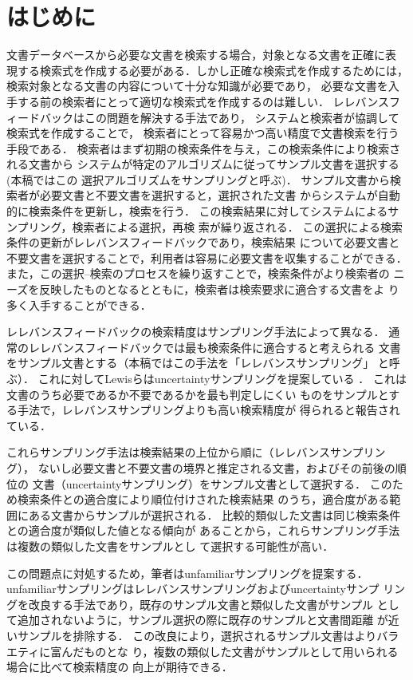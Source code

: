 \section{はじめに}
文書データベースから必要な文書を検索する場合，対象となる文書を正確に表
現する検索式を作成する必要がある．しかし正確な検索式を作成するためには，
検索対象となる文書の内容について十分な知識が必要であり，
必要な文書を入手する前の検索者にとって適切な検索式を作成するのは難しい．
レレバンスフィードバックはこの問題を解決する手法であり，
システムと検索者が協調して検索式を作成することで，
検索者にとって容易かつ高い精度で文書検索を行う手段である．
検索者はまず初期の検索条件を与え，この検索条件により検索される文書から
システムが特定のアルゴリズムに従ってサンプル文書を選択する(本稿ではこの
選択アルゴリズムをサンプリングと呼ぶ)．
サンプル文書から検索者が必要文書と不要文書を選択すると，選択された文書
からシステムが自動的に検索条件を更新し，検索を行う．
この検索結果に対してシステムによるサンプリング，検索者による選択，再検
索が繰り返される．
この選択による検索条件の更新がレレバンスフィードバックであり，検索結果
について必要文書と
不要文書を選択することで，利用者は容易に必要文書を収集することができる．
また，この選択--検索のプロセスを繰り返すことで，検索条件がより検索者の
ニーズを反映したものとなるとともに，検索者は検索要求に適合する文書をよ
り多く入手することができる．

レレバンスフィードバックの検索精度はサンプリング手法によって異なる．
通常のレレバンスフィードバックでは最も検索条件に適合すると考えられる
文書をサンプル文書とする（本稿ではこの手法を「レレバンスサンプリング」
と呼ぶ）．
これに対してLewisらはuncertaintyサンプリングを提案している
\cite{bib:DLewis}．
これは文書のうち必要であるか不要であるかを最も判定しにくい
ものをサンプルとする手法で，レレバンスサンプリングよりも高い検索精度が
得られると報告されている．

これらサンプリング手法は検索結果の上位から順に（レレバンスサンプリング），
ないし必要文書と不要文書の境界と推定される文書，およびその前後の順位の
文書（uncertaintyサンプリング）をサンプル文書として選択する．
このため検索条件との適合度により順位付けされた検索結果
のうち，適合度がある範囲にある文書からサンプルが選択される．
比較的類似した文書は同じ検索条件との適合度が類似した値となる傾向が
あることから，これらサンプリング手法は複数の類似した文書をサンプルとし
て選択する可能性が高い．

この問題点に対処するため，筆者はunfamiliarサンプリングを提案する．
unfamiliarサンプリングはレレバンスサンプリングおよびuncertaintyサンプ
リングを改良する手法であり，既存のサンプル文書と類似した文書がサンプル
として追加されないように，サンプル選択の際に既存のサンプルと文書間距離
が近いサンプルを排除する．
この改良により，選択されるサンプル文書はよりバラエティに富んだものとな
り，複数の類似した文書がサンプルとして用いられる場合に比べて検索精度の
向上が期待できる．


